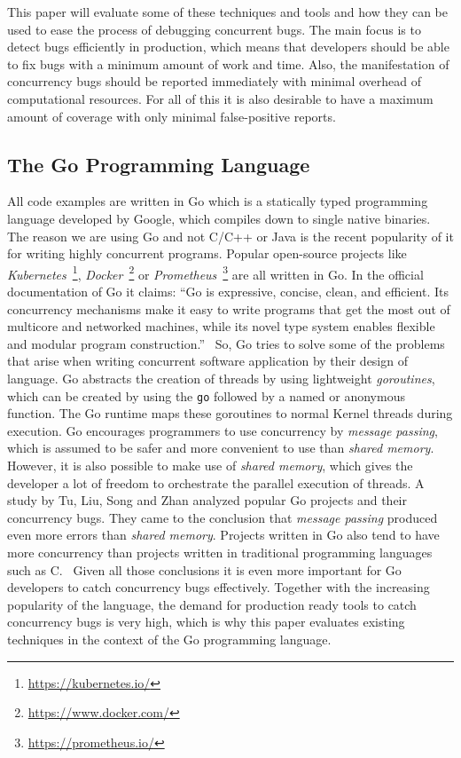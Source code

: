 \documentclass[conference]{IEEEtran}
\begin{document}
This paper will evaluate some of these techniques and tools and how they can be used to ease the process of debugging concurrent bugs.
The main focus is to detect bugs efficiently in production, which means that developers should be able to fix bugs with a minimum amount of work and time.
Also, the manifestation of concurrency bugs should be reported immediately with minimal overhead of computational resources.
For all of this it is also desirable to have a maximum amount of coverage with only minimal false-positive reports.

\subsection{The Go Programming Language}
All code examples are written in Go which is a statically typed programming language developed by Google, which compiles down to single native binaries.
The reason we are using Go and not C/C++ or Java is the recent popularity of it for writing highly concurrent programs.
Popular open-source projects like \emph{Kubernetes}~\footnote{\url{https://kubernetes.io/}}, \emph{Docker}~\footnote{\url{https://www.docker.com/}} or \emph{Prometheus}~\footnote{\url{https://prometheus.io/}} are all written in Go.
In the official documentation of Go it claims: ``Go is expressive, concise, clean, and efficient. Its concurrency mechanisms make it easy to write programs that get the most out of multicore and networked machines, while its novel type system enables flexible and modular program construction.''~\cite{goDocs}
So, Go tries to solve some of the problems that arise when writing concurrent software application by their design of language.
Go abstracts the creation of threads by using lightweight \emph{goroutines}, which can be created by using the \lstinline{go} followed by a named or anonymous function.
The Go runtime maps these goroutines to normal Kernel threads during execution.
Go encourages programmers to use concurrency by \emph{message passing}, which is assumed to be safer and more convenient to use than \emph{shared memory}.
However, it is also possible to make use of \emph{shared memory}, which gives the developer a lot of freedom to orchestrate the parallel execution of threads.
A study by Tu, Liu, Song and Zhan analyzed popular Go projects and their concurrency bugs.
They came to the conclusion that \emph{message passing} produced even more errors than \emph{shared memory}.
Projects written in Go also tend to have more concurrency than projects written in traditional programming languages such as C.~\cite{tu2019go}
Given all those conclusions it is even more important for Go developers to catch concurrency bugs effectively.
Together with the increasing popularity of the language, the demand for production ready tools to catch concurrency bugs is very high, which is why this paper evaluates existing techniques in the context of the Go programming language.
\end{document}
